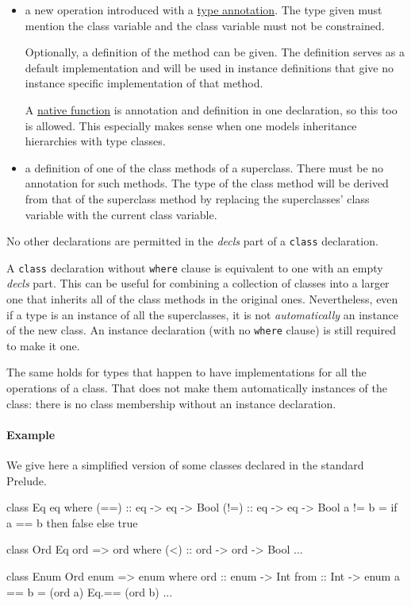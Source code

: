 \begin{itemize}
\item a new operation introduced with a \hyperref[annotation]{type annotation}. The type given must mention the class variable and the class variable must not be constrained.

Optionally, a definition of the method can be given. The definition serves as a default implementation and will be used in instance definitions that give no instance specific implementation of that method.

A \hyperref[nativefun]{native function} is annotation and definition in one declaration, so this too is allowed. This especially makes sense when one models \java{} inheritance hierarchies with type classes.

\item a definition of one of the class methods of a superclass. There must be no annotation for such methods. The type of the class method will be derived from that of the superclass method by replacing the superclasses' class variable with the current class variable.
\end{itemize}

No other declarations are permitted in the \emph{decls} part of a \texttt{class} declaration.

A \texttt{class} declaration without \texttt{where} clause is equivalent to one with an empty \emph{decls} part.
This can be useful for combining a collection of classes into a larger one that inherits all of the class methods in the original ones.
Nevertheless, even if a type is an instance of all the superclasses, it is not \emph{automatically} an instance of the new class. An instance declaration (with no \texttt{where} clause) is still required to make it one.

The same holds for types that happen to have implementations for all the operations of  a class. That does not make them automatically instances of the class: there is no class membership without an instance declaration.

\paragraph*{Example} We give here a simplified version of some classes declared in the standard Prelude.

\label{classexample}
\begin{code}
class Eq eq where
    (==) :: eq -> eq -> Bool
    (!=) :: eq -> eq -> Bool
    a != b  =  if a == b then false else true

class Ord Eq ord => ord where
    (<)  :: ord -> ord -> Bool
    ...

class Enum Ord enum => enum where
    ord   :: enum -> Int
    from :: Int -> enum
    a == b  =  (ord a) Eq.== (ord b)
    ...
\end{code}


